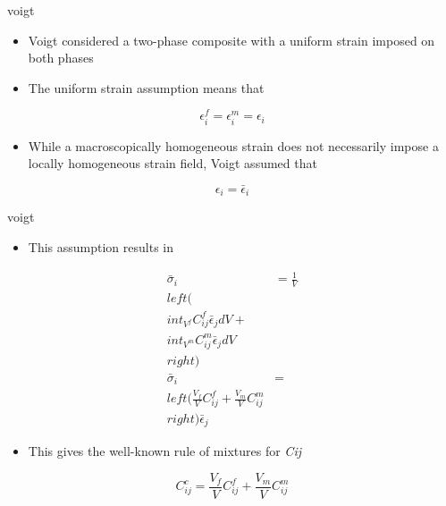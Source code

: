 \documentclass[
  letterpaper,
  ignorenonframetext,
  aspectratio=43,
  handout,
  12pt]{beamer}
\providecommand{\tightlist}{%
  \setlength{\itemsep}{0pt}\setlength{\parskip}{0pt}}
\providecommand{\tightlist}{%
\setlength{\itemsep}{0pt}\setlength{\parskip}{0pt}}
\begin{document}
\begin{frame}{voigt}
\protect\hypertarget{voigt}{}
\begin{itemize}
\tightlist
\item
  Voigt considered a two-phase composite with a uniform strain imposed
  on both phases
\item
  The uniform strain assumption means that
\end{itemize}

\[ \epsilon_i^f = \epsilon_i^m = \epsilon_i\]

\begin{itemize}
\tightlist
\item
  While a macroscopically homogeneous strain does not necessarily impose
  a locally homogeneous strain field, Voigt assumed that
\end{itemize}

\[\epsilon_i = \bar{\epsilon}_i\]
\end{frame}

\begin{frame}{voigt}
\protect\hypertarget{voigt-1}{}
\begin{itemize}
\tightlist
\item
  This assumption results in
\end{itemize}

\[\begin{aligned}
  \bar{\sigma}_i &= \frac{1}{V}\\left(\\int_{V^f} C_{ij}^f\bar{\epsilon}_j dV  + \\int_{V^m} C_{ij}^m\bar{\epsilon}_j dV\\right)\\
  \bar{\sigma}_i &= \\left( \frac{V_f}{V} C_{ij}^f + \frac{V_m}{V} C_{ij}^m\\right)\bar{\epsilon}_j
\end{aligned}\]

\begin{itemize}
\tightlist
\item
  This gives the well-known rule of mixtures for \emph{C}\emph{ij}
\end{itemize}

\[C_{ij}^c = \frac{V_f}{V} C_{ij}^f + \frac{V_m}{V} C_{ij}^m\]
\end{frame}
\end{document}
